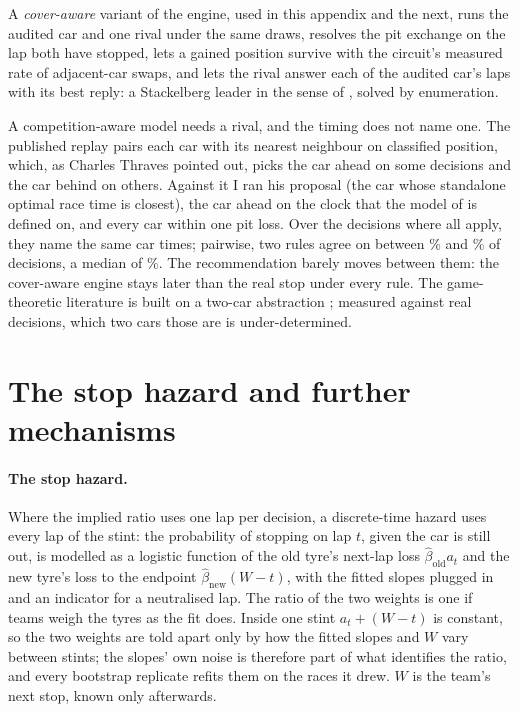 \documentclass[11pt,a4paper]{article}
\begin{document}
A \emph{cover-aware} variant of the engine, used in this appendix and the
next, runs the audited car and one rival
under the same draws, resolves the pit exchange on the lap both have stopped,
lets a gained position survive with the circuit's measured rate of adjacent-car
swaps, and lets the rival answer each of the audited car's laps with its best
reply: a Stackelberg leader in the sense of \citet{aguad2024}, solved by
enumeration.

A competition-aware model needs a rival, and the timing does not name one. The
published replay pairs each car with its nearest neighbour on classified
position, which, as Charles Thraves pointed out, picks the car ahead on some
decisions and the car behind on others. Against it I ran his proposal (the car
whose standalone optimal race time is closest), the car ahead on the clock that
the model of \citet{salminen2026} is defined on, and every car within one pit
loss. Over the \NRivalAllApply{} decisions where all \NRivalRules{} apply, they
name the same car \NRivalAllAgree{} times; pairwise, two rules agree on between
\RivalPairMin{}\% and \RivalPairMax{}\% of decisions, a median of
\RivalPairMedian{}\%. The recommendation barely moves between them: the
cover-aware engine stays later than the real stop under every rule. The
game-theoretic literature is built on a two-car abstraction
\citep{aguad2024,devries2026,salminen2026}; measured against real decisions,
which two cars those are is under-determined.


\section{The stop hazard and further mechanisms}
\label{app:mechanisms}

\paragraph{The stop hazard.} Where the implied ratio uses one lap per decision, a
discrete-time hazard uses every lap of the stint: the probability of stopping on lap $t$, given the car is
still out, is modelled as a logistic function of the old tyre's next-lap loss
$\hat\beta_{\mathrm{old}}a_t$ and the new tyre's loss to the endpoint
$\hat\beta_{\mathrm{new}}(W-t)$, with the fitted slopes plugged in and an
indicator for a neutralised lap. The ratio of the two weights is one if teams
weigh the tyres as the fit does. Inside one stint $a_t + (W-t)$ is constant, so
the two weights are told apart only by how the fitted slopes and $W$ vary
between stints; the slopes' own noise is therefore part of what identifies the
ratio, and every bootstrap replicate refits them on the races it drew. $W$ is
the team's next stop, known only afterwards.
\end{document}

